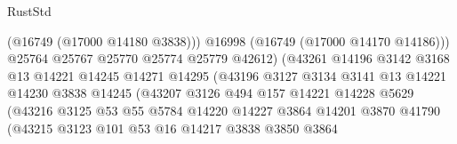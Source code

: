 \begin{lexlean}{RustStd}
\begin{coremodule}
                                          (@16749 (@17000 @14180 @3838)))
                                        @16998
                                        (@16749 (@17000 @14170 @14186)))
                                      @25764
                                      @25767
                                      @25770
                                      @25774
                                      @25779
                                      @42612)
                                    (@43261
                                      @14196
                                      @3142
                                      @3168
                                      @13
                                      @14221
                                      @14245
                                      @14271
                                      @14295
                                      (@43196
                                        @3127
                                        @3134
                                        @3141
                                        @13
                                        @14221
                                        @14230
                                        @3838
                                        @14245
                                        (@43207
                                          @3126
                                          @494
                                          @157
                                          @14221
                                          @14228
                                          @5629
                                          (@43216
                                            @3125
                                            @53
                                            @55
                                            @5784
                                            @14220
                                            @14227
                                            @3864
                                            @14201
                                            @3870
                                            @41790
                                            (@43215
                                              @3123
                                              @101
                                              @53
                                              @16
                                              @14217
                                              @3838
                                              @3850
                                              @3864

\end{coremodule}
\end{lexlean}
